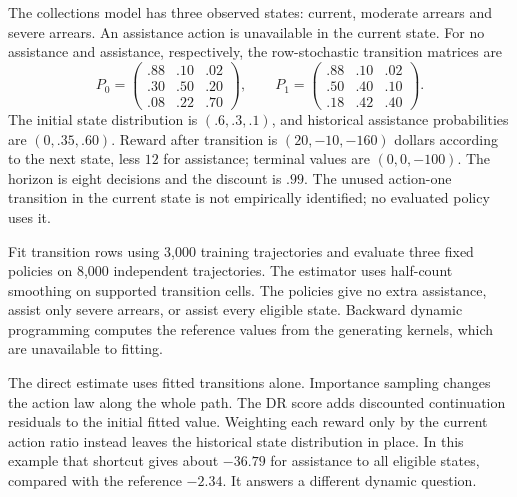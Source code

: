 The collections model has three observed states: current, moderate
arrears and severe arrears. An assistance action is unavailable in the
current state. For no assistance and assistance, respectively, the
row-stochastic transition matrices are
\[
 P_0=\begin{pmatrix}.88&.10&.02\\.30&.50&.20\\.08&.22&.70\end{pmatrix},
 \qquad
 P_1=\begin{pmatrix}.88&.10&.02\\.50&.40&.10\\.18&.42&.40\end{pmatrix}.
\]
The initial state distribution is $(.6,.3,.1)$, and historical assistance
probabilities are $(0,.35,.60)$. Reward after transition is
$(20,-10,-160)$ dollars according to the next state, less $12$ for
assistance; terminal values are $(0,0,-100)$. The horizon is eight
decisions and the discount is $.99$. The unused action-one transition
in the current state is not empirically identified; no evaluated policy
uses it.

Fit transition rows using 3,000 training trajectories and evaluate
three fixed policies on 8,000 independent trajectories. The estimator
uses half-count smoothing on supported transition cells. The policies
give no extra assistance, assist only severe arrears, or assist every
eligible state. Backward dynamic programming computes the reference
values from the generating kernels, which are unavailable to fitting.

\begin{table}[htbp]\centering\small

\caption{Values in synthetic dollars per trajectory. IPS uses cumulative
ratios; DR adds the continuation residuals. Final-weight ESS is a
diagnostic, not a general effective sample size for every estimator.}
\end{table}

The direct estimate uses fitted transitions alone. Importance sampling
changes the action law along the whole path. The DR score adds discounted
continuation residuals to the initial fitted value. Weighting each
reward only by the current action ratio instead leaves the historical
state distribution in place. In this example that shortcut gives about
$-36.79$ for assistance to all eligible states, compared with the
reference $-2.34$. It answers a different dynamic question.


